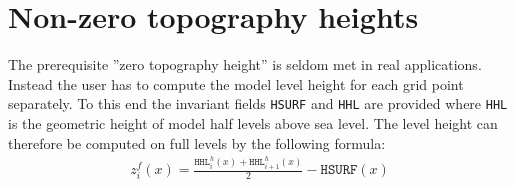 \section{Non-zero topography heights}

The prerequisite ''zero topography height'' is seldom met in real
applications.
Instead the user has to compute the model level height for each grid
point separately.
To this end the invariant fields \texttt{HSURF} and \texttt{HHL} are
provided where \texttt{HHL} is the geometric height of model half
levels above sea level.
The level height can therefore be computed on full levels by the
following formula:
\begin{align*}
  z^{f}_{i}(x) = \frac{ \texttt{HHL}^{h}_{i}(x) + \texttt{HHL}^{h}_{i+1}(x) }{2} - \texttt{HSURF}(x) 
\end{align*}


%
